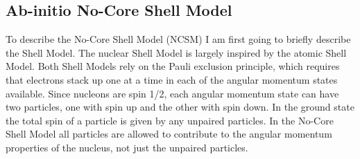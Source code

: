 \subsection{Ab-initio No-Core Shell Model}
To describe the No-Core Shell Model (NCSM) I am first going to briefly describe the Shell Model. The nuclear Shell Model is largely inspired by the atomic Shell Model. Both Shell Models rely on the Pauli exclusion principle, which requires that electrons stack up one at a time in each of the angular momentum states available. Since nucleons are spin 1/2, each angular momentum state can have two particles, one with spin up and the other with spin down. In the ground state the total spin of a particle is given by any unpaired particles. In the No-Core Shell Model all particles are allowed to contribute to the angular momentum properties of the nucleus, not just the unpaired particles.

